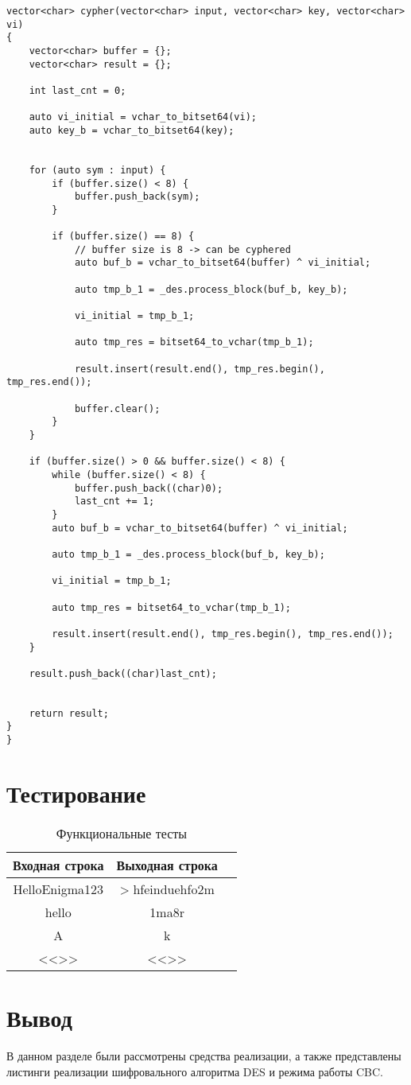 \begin{lstlisting}[label=lst:ecb,caption=Реализация метода шифрования и дешифрования DES в режиме CBС]
vector<char> cypher(vector<char> input, vector<char> key, vector<char> vi)
{
	vector<char> buffer = {};
	vector<char> result = {};
	
	int last_cnt = 0;
	
	auto vi_initial = vchar_to_bitset64(vi);
	auto key_b = vchar_to_bitset64(key);
	
	
	for (auto sym : input) {
		if (buffer.size() < 8) {
			buffer.push_back(sym);
		}
		
		if (buffer.size() == 8) {
			// buffer size is 8 -> can be cyphered
			auto buf_b = vchar_to_bitset64(buffer) ^ vi_initial;
			
			auto tmp_b_1 = _des.process_block(buf_b, key_b);
			
			vi_initial = tmp_b_1;
			
			auto tmp_res = bitset64_to_vchar(tmp_b_1);
			
			result.insert(result.end(), tmp_res.begin(), tmp_res.end());
			
			buffer.clear();
		}
	}
	
	if (buffer.size() > 0 && buffer.size() < 8) {
		while (buffer.size() < 8) {
			buffer.push_back((char)0);
			last_cnt += 1;
		}
		auto buf_b = vchar_to_bitset64(buffer) ^ vi_initial;
		
		auto tmp_b_1 = _des.process_block(buf_b, key_b);
		
		vi_initial = tmp_b_1;
		
		auto tmp_res = bitset64_to_vchar(tmp_b_1);
		
		result.insert(result.end(), tmp_res.begin(), tmp_res.end());
	}
	
	result.push_back((char)last_cnt);
	
	
	return result;
}
}
\end{lstlisting}

\section{Тестирование}
\begin{table}[ht!]
	\begin{center}
		\captionsetup{justification=raggedright,singlelinecheck=off}
		\caption{\label{tbl:functional_test} Функциональные тесты}
		\begin{tabular}{|c|c|c|}
			\hline
			Входная строка & Выходная строка \\ 
			\hline
			HelloEnigma123 & >hfeinduehfo2m \\
			hello  & 1ma8r\\
			A & k\\
			<<>>  & <<>>\\
			\hline
		\end{tabular}
	\end{center}
\end{table}
\clearpage

\section*{Вывод}

В данном разделе были рассмотрены средства реализации, а также представлены листинги реализации шифровального алгоритма DES и режима работы CBC.